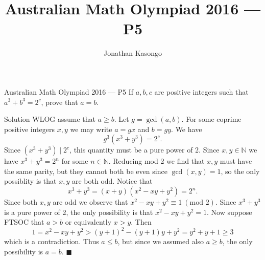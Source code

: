 \documentclass{article}
\author{Jonathan Kasongo}
\title{Australian Math Olympiad 2016 --- P5}
\begin{document}
\maketitle

\begin{problem}{Australian Math Olympiad 2016 --- P5}
If $a,b,c$ are positive integers such that $a^3 + b^3 = 2^c$, prove that
$a = b$.
\end{problem}

\begin{solution}{Solution}
WLOG assume that $a \geq b$.
Let $g = \gcd(a,b)$. For some coprime positive integers $x,y$ we may write
$a = gx$ and $b = gy$. We have
$$
g^3(x^3 + y^3) = 2^c.
$$
Since $(x^3 + y^3) \mid 2^c$, this quantity must be a pure power of 2.
Since $x,y \in \mathbb{N}$ we have $x^3 + y^3 = 2^n$ for some
$n \in \mathbb{N}$. Reducing mod 2 we find that $x,y$ must have the same
parity, but they cannot both be even since $\gcd(x,y) = 1$, so the only
possiblity is that $x,y$ are both odd. Notice that
$$
x^3 + y^3 = (x + y)(x^2 - xy + y^2) = 2^n.
$$
Since both $x,y$ are odd we observe that
$x^2 - xy + y^2 \equiv 1 \ (\text{mod } 2)$. Since $x^3 + y^3$ is a pure
power of 2, the only possibility is that
$
x^2 - xy + y^2 = 1.
$
Now suppose FTSOC that $a > b$ or equivalently $x > y$. Then
$$
1 = x^2 - xy + y^2 > (y+1)^2 - (y+1)y + y^2 = y^2 + y + 1 \geq 3
$$
which is a contradiction. Thus $a\leq b$, but since we assumed also
$a\geq b$, the only possibility is $a = b$. $\blacksquare$
\end{solution}
\end{document}
